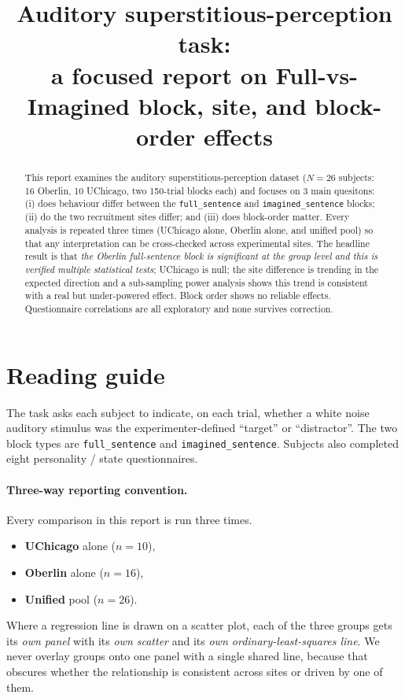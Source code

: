 \documentclass[11pt]{article}
\title{Auditory superstitious-perception task:\\
       a focused report on Full-vs-Imagined block, site, and block-order
       effects}
\author{}
\date{}
\begin{document}
\maketitle

\begin{abstract}
\noindent
This report examines the auditory superstitious-perception dataset
($N\!=\!26$ subjects: 16 Oberlin, 10 UChicago, two 150-trial blocks each)
and focuses on 3 main quesitons: (i) does behaviour differ
between the \texttt{full\_sentence} and \texttt{imagined\_sentence}
blocks; (ii) do the two recruitment sites differ; and (iii) does
block-order matter.  Every analysis is repeated three times
(UChicago alone, Oberlin alone, and unified pool) so that any
interpretation can be cross-checked across experimental sites.
The headline result is that \emph{the Oberlin full-sentence block is
significant at the group level and this is verified multiple statistical tests}; 
UChicago is null; the site difference is trending in the
expected direction and a sub-sampling power analysis shows this
trend is consistent with a real but under-powered effect.  Block
order shows no reliable effects.  Questionnaire correlations are all
exploratory and none survives correction.
\end{abstract}

\tableofcontents

\section{Reading guide}

The task asks each subject to indicate, on each trial, whether a white noise
auditory stimulus was the experimenter-defined ``target'' or ``distractor''. The two block types are
\texttt{full\_sentence} and \texttt{imagined\_sentence}.  
Subjects also completed eight personality / state
questionnaires.

\paragraph{Three-way reporting convention.}
Every comparison in this report is run three times.
\begin{itemize}
\item \textbf{UChicago} alone ($n=10$),
\item \textbf{Oberlin}  alone ($n=16$),
\item \textbf{Unified}  pool ($n=26$).
\end{itemize}
Where a regression line is drawn on a scatter plot, each of the three
groups gets its \emph{own panel} with its \emph{own scatter} and its
\emph{own ordinary-least-squares line}.  We never overlay groups onto
one panel with a single shared line, because that obscures whether the
relationship is consistent across sites or driven by one of them.
\end{document}

